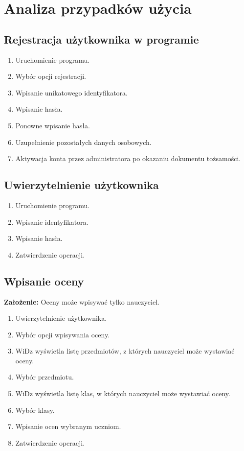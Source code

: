 \documentclass[12pt,leqno,twoside]{mwart}
\begin{document}
\section{Analiza przypadków użycia}
\subsection{Rejestracja użytkownika w programie}
\begin{enumerate}
\item Uruchomienie programu.
\item Wybór opcji rejestracji.
\item Wpisanie unikatowego identyfikatora.
\item Wpisanie hasła.
\item Ponowne wpisanie hasła.
\item Uzupełnienie pozostałych danych osobowych.
\item Aktywacja konta przez administratora po okazaniu dokumentu tożsamości.
\end{enumerate}
\subsection{Uwierzytelnienie użytkownika}
\begin{enumerate}
\item Uruchomienie programu.
\item Wpisanie identyfikatora.
\item Wpisanie hasła.
\item Zatwierdzenie operacji.
\end{enumerate}
\subsection{Wpisanie oceny}
\noindent  \textbf{Założenie:} Oceny może wpisywać tylko nauczyciel.\\
\begin{enumerate}
\item Uwierzytelnienie użytkownika.
\item Wybór opcji wpisywania oceny.
\item WiDz wyświetla listę przedmiotów, z których nauczyciel może wystawiać oceny.
\item Wybór przedmiotu.
\item WiDz wyświetla listę klas, w których nauczyciel może wystawiać oceny.
\item Wybór klasy.
\item Wpisanie ocen wybranym uczniom.
\item Zatwierdzenie operacji.
\end{enumerate}
\end{document}
